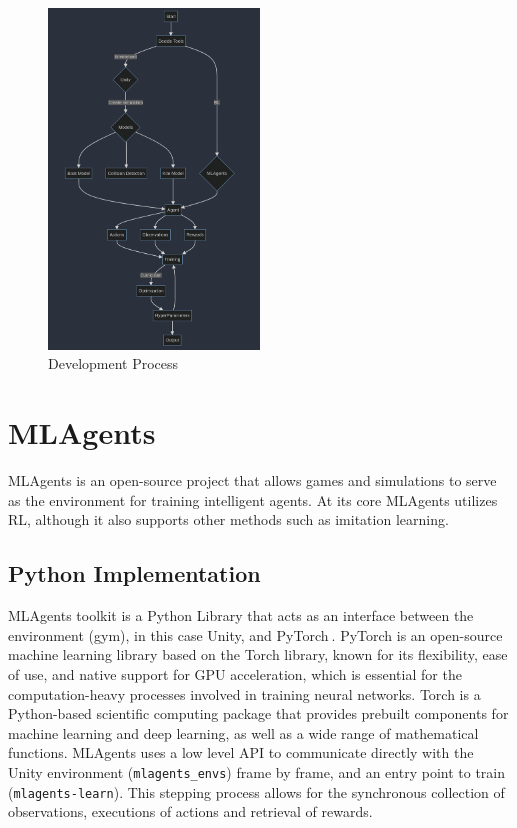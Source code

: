\begin{figure}[h]
    \centering
    \includegraphics[width=0.5\textwidth]{Images/method.png}
    \caption{Development Process}\label{development_process}
\end{figure}

\section{MLAgents}
MLAgents is an open-source project that allows games and simulations to serve as the environment for training intelligent agents. At its core MLAgents utilizes RL, although it also supports other methods such as imitation learning.

\subsection{Python Implementation}

MLAgents toolkit is a Python Library that acts as an interface between the environment (gym), in this case Unity, and PyTorch$~$\cite{paszke2019pytorch}. PyTorch is an open-source machine learning library based on the Torch library, known for its flexibility, ease of use, and native support for GPU acceleration, which is essential for the computation-heavy processes involved in training neural networks. Torch is a Python-based scientific computing package that provides prebuilt components for machine learning and deep learning, as well as a wide range of mathematical functions. MLAgents uses a low level API to communicate directly with the Unity environment (\texttt{mlagents\_envs}) frame by frame, and an entry point to train (\texttt{mlagents-learn}). This stepping process allows for the synchronous collection of observations, executions of actions and retrieval of rewards. 


